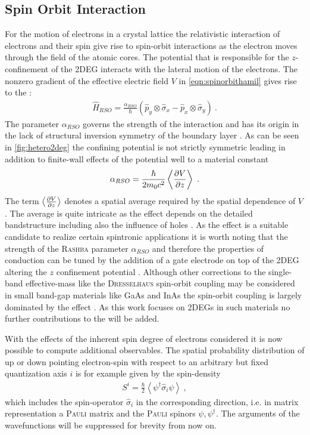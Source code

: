 \subsection{Spin Orbit Interaction}
For the motion of electrons in a crystal lattice the relativistic interaction of electrons and their spin give rise to spin-orbit interactions as the electron moves through the field of the atomic cores.
The potential that is responsible for the $z$-confinement of the 2DEG interacts with the lateral motion of the electrons. The nonzero gradient of the effective electric field $V$ in \cref{eqn:spinorbithamil} gives rise to the \rash{} \hamil{}:
\begin{align}
  \hat{H}_{RSO} =\frac{\alpha_{RSO}}{\hbar}(\hat{p}_{y} \otimes \hat{\sigma}_{x} - \hat{p}_{x} \otimes \hat{\sigma}_{y})\ .
	\label{eqn:rashbahamiltonian}
\end{align}
The parameter $\alpha_{RSO}$ governs the strength of the interaction and has its origin in the lack of structural inversion symmetry of the boundary layer \cite{PhysRevB.70.233311}.
As can be seen in \cref{fig:hetero2deg} the confining potential is not strictly symmetric leading in addition to finite-wall effects of the potential well to a material constant \cite{Metalidis2007Thesis}
\begin{align}
\alpha_{RSO} = \frac{\hbar}{2m_0c^2} \left<\frac{\partial V}{\partial z} \right>\ .
\label{eqn:alpharashba}
\end{align}
The term $\left<\frac{\partial V}{\partial z} \right>$ denotes a spatial average required by the spatial dependence of $V$. The average is quite intricate as the effect depends on the detailed bandstructure including also the influence of holes \cite{JApplPhys.83.4324}.
As the \rash{} effect is a suitable candidate to realize certain spintronic applications it is worth noting that the strength of the \textsc{Rashba} parameter $\alpha_{RSO}$ and therefore the properties of conduction can be tuned by the addition of a gate electrode on top of the 2DEG altering the $z$ confinement potential \cite{PhysRevLett.78.1335}.
Although other corrections to the single-band effective-mass \hamil{} like the \textsc{Dresselhaus} spin-orbit coupling \cite{PhysRev.100.580} may be considered in small band-gap materials like GaAs and InAs the spin-orbit coupling is largely dominated by the \rash{} effect \cite{PhysRevB.61.15588}. As this work focuses on 2DEGs in such materials no further contributions to the \hamil{} will be added.\par
With the effects of the inherent spin degree of electrons considered it is now possible to compute additional observables. The spatial probability distribution of up or down pointing electron-spin with respect to an arbitrary but fixed quantization axis $i$ is for example given by the spin-density \cite{JPhysA:MathGen.18.671}
\begin{align}
S^i  = \frac{\hbar}{2} \left< \psi^{\dagger} \hat{\sigma}_i \psi \right>\ ,
\label{eqn:spindensity}
\end{align}
which includes the spin-operator $\hat{\sigma}_i$ in the corresponding direction, i.e. in matrix representation a \textsc{Pauli} matrix and the \textsc{Pauli} spinors $\psi,\psi^{\dagger}$. The arguments of the wavefunctions will be suppressed for brevity from now on.
